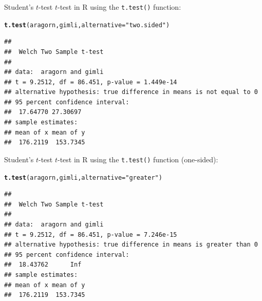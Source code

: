 \documentclass[aspectratio=169]{beamer}\usepackage[]{graphicx}\usepackage[]{color}
\makeatletter
\newcommand{\hlstr}[1]{\textcolor[rgb]{0.192,0.494,0.8}{#1}}%
\newcommand{\hlstd}[1]{\textcolor[rgb]{0.345,0.345,0.345}{#1}}%
\newcommand{\hlkwc}[1]{\textcolor[rgb]{0.333,0.667,0.333}{#1}}%
\newcommand{\hlkwd}[1]{\textcolor[rgb]{0.737,0.353,0.396}{\textbf{#1}}}%
\newenvironment{kframe}{%
 \def\at@end@of@kframe{}%
 \ifinner\ifhmode%
  \def\at@end@of@kframe{\end{minipage}}%
  \begin{minipage}{\columnwidth}%
 \fi\fi%
 \def\FrameCommand##1{\hskip\@totalleftmargin \hskip-\fboxsep
 \colorbox{shadecolor}{##1}\hskip-\fboxsep
     \hskip-\linewidth \hskip-\@totalleftmargin \hskip\columnwidth}%
 \MakeFramed {\advance\hsize-\width
   \@totalleftmargin\z@ \linewidth\hsize
   \@setminipage}}%
 {\par\unskip\endMakeFramed%
 \at@end@of@kframe}
\newenvironment{knitrout}{}{} %
\makeatother
\begin{document}
\begin{frame}[fragile]{Student's $t$-test}
$t$-test in R using the \texttt{t.test()} function:
\begin{knitrout}\scriptsize
{}\color{fgcolor}\begin{kframe}
\begin{alltt}
\hlkwd{t.test}\hlstd{(aragorn, gimli,} \hlkwc{alternative} \hlstd{=} \hlstr{"two.sided"}\hlstd{)}
\end{alltt}
\begin{verbatim}
## 
## 	Welch Two Sample t-test
## 
## data:  aragorn and gimli
## t = 9.2512, df = 86.451, p-value = 1.449e-14
## alternative hypothesis: true difference in means is not equal to 0
## 95 percent confidence interval:
##  17.64770 27.30697
## sample estimates:
## mean of x mean of y 
##  176.2119  153.7345
\end{verbatim}
\end{kframe}
\end{knitrout}
\end{frame}

\begin{frame}[fragile]{Student's $t$-test}
$t$-test in R using the \texttt{t.test()} function (one-sided):
\begin{knitrout}\scriptsize
{}\color{fgcolor}\begin{kframe}
\begin{alltt}
\hlkwd{t.test}\hlstd{(aragorn, gimli,} \hlkwc{alternative} \hlstd{=} \hlstr{"greater"}\hlstd{)}
\end{alltt}
\begin{verbatim}
## 
## 	Welch Two Sample t-test
## 
## data:  aragorn and gimli
## t = 9.2512, df = 86.451, p-value = 7.246e-15
## alternative hypothesis: true difference in means is greater than 0
## 95 percent confidence interval:
##  18.43762      Inf
## sample estimates:
## mean of x mean of y 
##  176.2119  153.7345
\end{verbatim}
\end{kframe}
\end{knitrout}
\end{frame}
\end{document}
